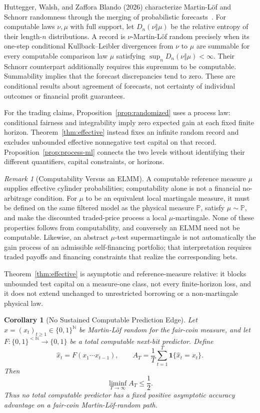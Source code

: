 \documentclass[aps,pra,reprint,superscriptaddress,amsmath,amssymb,floatfix]{revtex4-2}
\theoremstyle{plain}
\newtheorem{corollary}[theorem]{Corollary}
\theoremstyle{definition}
\theoremstyle{remark}
\newtheorem{remark}{Remark}
\begin{document}
Huttegger, Walsh, and Zaffora Blando (2026) characterize Martin-L\"of and
Schnorr randomness through the merging of probabilistic
forecasts~\cite{HutteggerWalshZafforaBlando2026}. For computable laws \(\nu,\mu\)
with full support, let \(D_n(\nu\Vert\mu)\) be the relative entropy of their
length-\(n\) distributions. A record is \(\nu\)-Martin-L\"of random precisely
when its one-step conditional Kullback--Leibler divergences from \(\nu\) to
\(\mu\) are summable for every computable comparison law \(\mu\) satisfying
\(\sup_n D_n(\nu\Vert\mu)<\infty\). Their Schnorr counterpart additionally
requires this supremum to be computable. Summability implies that the
forecast discrepancies tend to zero. These are conditional results about
agreement of forecasts, not certainty of individual outcomes or financial
profit guarantees.

For the trading claims, Proposition~\ref{prop:randomized} uses a process law:
conditional fairness and integrability imply zero expected gain at each fixed
finite horizon. Theorem~\ref{thm:effective} instead fixes an infinite random
record and excludes unbounded effective nonnegative test capital on that
record. Proposition~\ref{prop:process-ml} connects the two levels without
identifying their different quantifiers, capital constraints, or horizons.

\begin{remark}[Computability Versus an ELMM]
A computable reference measure \(\mu\) supplies effective cylinder
probabilities; computability alone is not a financial no-arbitrage condition.
For \(\mu\) to be an equivalent local martingale measure, it must be defined on
the same filtered model as the physical measure \(\mathbb P\), satisfy
\(\mu\sim\mathbb P\), and make the discounted traded-price process a local
\(\mu\)-martingale. None of these properties follows from computability, and
conversely an ELMM need not be computable. Likewise, an abstract
\(\mu\)-test supermartingale is not automatically the gain process of an
admissible self-financing portfolio; that interpretation requires traded
payoffs and financing constraints that realize the corresponding bets.
\end{remark}

Theorem~\ref{thm:effective} is asymptotic and reference-measure relative: it
blocks unbounded test capital on a measure-one class, not every finite-horizon
loss, and it does not extend unchanged to unrestricted borrowing or a
non-martingale physical law.

\begin{corollary}[No Sustained Computable Prediction Edge]
  \label{cor:prediction-edge}
  Let \(x=(x_t)_{t\geq1}\in\{0,1\}^{\mathbb N}\) be Martin-L\"of random for
  the fair-coin measure, and let
  \(F\colon\{0,1\}^{<\mathbb N}\to\{0,1\}\) be a total computable next-bit
  predictor. Define
  \[
    \widehat x_t=F(x_1\cdots x_{t-1}),
    \qquad
    A_T=\frac1T\sum_{t=1}^T
      \mathbf 1\{\widehat x_t=x_t\}.
  \]
  Then
  \[
    \liminf_{T\to\infty}A_T\leq\frac12.
  \]
  Thus no total computable predictor has a fixed positive asymptotic accuracy
  advantage on a fair-coin Martin-L\"of-random path.
\end{corollary}
\end{document}
